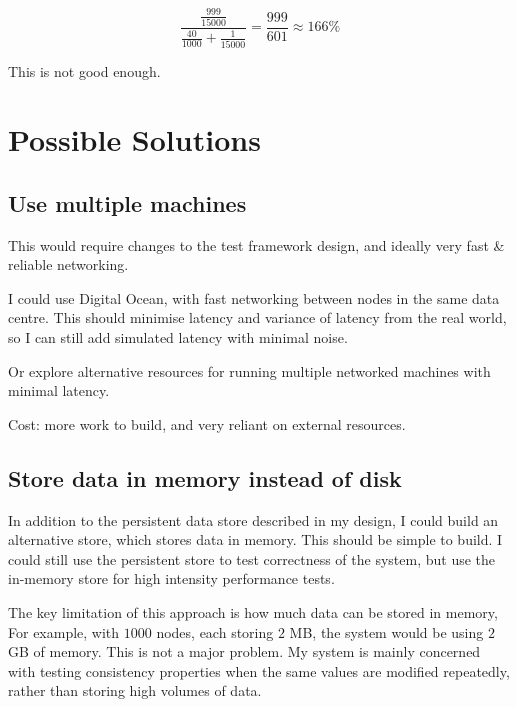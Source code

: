 \documentclass[12pt,a4paper]{article}
\begin{document}
$$\frac{\frac{999}{15000}}{\frac{40}{1000} + \frac{1}{15000}} = \frac{999}{601} \approx 166\%$$

This is not good enough.

\section*{Possible Solutions}

\subsection{Use multiple machines}

This would require changes to the test framework design, and ideally very fast \& reliable networking.

I could use Digital Ocean, with fast networking between nodes in the same data centre. This should minimise latency and variance of latency from the real world, so I can still add simulated latency with minimal noise.

Or explore alternative resources for running multiple networked machines with minimal latency.

Cost: more work to build, and very reliant on external resources.

\subsection{Store data in memory instead of disk}

In addition to the persistent data store described in my design, I could build an alternative store, which stores data in memory. This should be simple to build. I could still use the persistent store to test correctness of the system, but use the in-memory store for high intensity performance tests.

The key limitation of this approach is how much data can be stored in memory, For example, with $1000$ nodes, each storing $2$ MB, the system would be using $2$ GB of memory. This is not a major problem. My system is mainly concerned with testing consistency properties when the same values are modified repeatedly, rather than storing high volumes of data.
\end{document}
